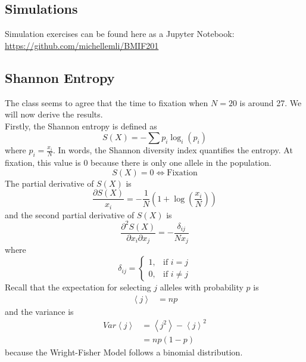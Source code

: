 \documentclass[12pt]{extarticle}
\newcommand{\<}{\langle}
\renewcommand{\>}{\rangle}
\theoremstyle{definition}
\begin{document}
\subsection{Simulations}
Simulation exercises can be found here as a Jupyter Notebook: \url{https://github.com/michellemli/BMIF201}\\

\subsection{Shannon Entropy}

The class seems to agree that the time to fixation when $N = 20$ is around 27. We will now derive the results.\\

\noindent Firstly, the Shannon entropy is defined as
\begin{equation}
    S(X) = -\sum p_i \log_i(p_i) \label{S_X}
\end{equation}
where $\displaystyle p_i = \frac{x_i}{N}$. In words, the Shannon diversity index quantifies the entropy. At fixation, this value is $0$ because there is only one allele in the population.
\begin{equation}
    S(X) = 0 \Longleftrightarrow \text{Fixation} \nonumber
\end{equation}
The partial derivative of $S(X)$ is
\begin{equation}
    \frac{\partial S(X)}{x_i} = -\frac{1}{N}(1 + \log(\frac{x_i}{N})) \nonumber
\end{equation}
and the second partial derivative of $S(X)$ is
\begin{equation}
    \frac{\partial^2 S(X)}{\partial x_i \partial x_j} = -\frac{\delta_{ij}}{Nx_j} \label{partial^2}
\end{equation}
where
\begin{equation}
    \delta_{ij} = \begin{cases}
        1, & \text{if } i = j\\
        0, & \text{if } i \neq j
    \end{cases} \label{delta}
\end{equation}
Recall that the expectation for selecting $j$ alleles with probability $p$ is
\begin{align}
    \left< j \right> &= np \label{exp}
\end{align}
and the variance is
\begin{align}
    Var \left< j \right> &= \left< j^2 \right> - \left< j \right>^2 \label{var1} \\
    &= np(1-p) \label{var2}
\end{align}
because the Wright-Fisher Model follows a binomial distribution.\\
\end{document}
